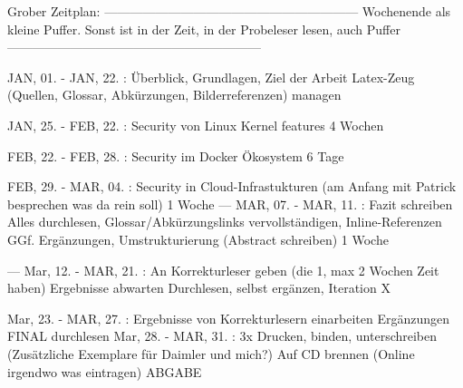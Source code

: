 Grober Zeitplan:
------------------------------------------------------------
Wochenende als kleine Puffer.
Sonst ist in der Zeit, in der Probeleser lesen, auch Puffer
------------------------------------------------------------

JAN, 01. - JAN, 22. : Überblick, Grundlagen, Ziel der Arbeit
                      Latex-Zeug (Quellen, Glossar, Abkürzungen, Bilderreferenzen) managen

JAN, 25. - FEB, 22. : Security von Linux Kernel features
                      4 Wochen

FEB, 22. - FEB, 28. : Security im Docker Ökosystem
                      6 Tage

FEB, 29. - MAR, 04. : Security in Cloud-Infrastukturen (am Anfang mit Patrick besprechen was da rein soll)
                      1 Woche
---
MAR, 07. - MAR, 11. : Fazit schreiben
                      Alles durchlesen, Glossar/Abkürzungslinks vervollständigen, Inline-Referenzen
                      GGf. Ergänzungen, Umstrukturierung
                      (Abstract schreiben)
                      1 Woche

---
Mar, 12. - MAR, 21. : An Korrekturleser geben (die 1, max 2 Wochen Zeit haben)
                      Ergebnisse abwarten
                      Durchlesen, selbst ergänzen, Iteration X

Mar, 23. - MAR, 27. : Ergebnisse von Korrekturlesern einarbeiten
                      Ergänzungen
                      FINAL durchlesen
Mar, 28. - MAR, 31. : 3x Drucken, binden, unterschreiben (Zusätzliche Exemplare für Daimler und mich?)
                      Auf CD brennen
                      (Online irgendwo was eintragen)
                      ABGABE
